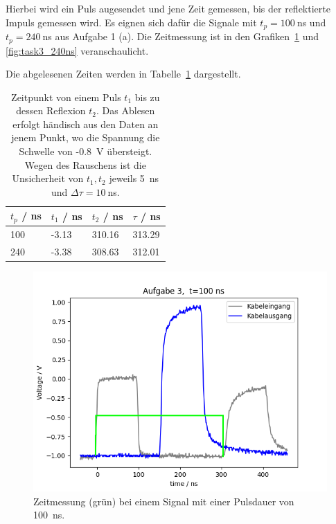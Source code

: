 \documentclass{article}
\begin{document}
Hierbei wird ein Puls augesendet und jene Zeit gemessen, bis der reflektierte Impuls gemessen wird. Es eignen sich dafür die Signale mit $t_p=100~$ns und $t_p=240~$ns aus Aufgabe 1 (a). Die Zeitmessung ist in den Grafiken~\ref{fig:task3_100ns} und \ref{fig:task3_240ns} veranschaulicht.

Die abgelesenen Zeiten werden in Tabelle~\ref{tab:task3_zeiten} dargestellt.
\begin{table}[H]
\caption{Zeitpunkt von einem Puls $t_1$ bis zu dessen Reflexion $t_2$. Das Ablesen erfolgt händisch aus den Daten an jenem Punkt, wo die Spannung die Schwelle von -0.8~V übersteigt. Wegen des Rauschens ist die Unsicherheit von $t_1,t_2$ jeweils 5~ns und $\Delta \tau = 10~$ns.}
\label{tab:task3_zeiten}
\begin{tabular}{l|lll}
$t_p$ / ns & $t_1$ / ns & $t_2$ / ns & $\tau$ / ns  \\
\hline
100 &  -3.13 & 310.16 & 313.29 \\
240 &  -3.38 & 308.63 & 312.01
\end{tabular}
\end{table}

\begin{figure}[H]
\centering
\caption{Zeitmessung (grün) bei einem Signal mit einer Pulsdauer von 100~ns.}
\label{fig:task3_100ns}
\includegraphics[scale=0.6]{bilder/task3/task3_100ns.png}
\end{figure}
\end{document}
